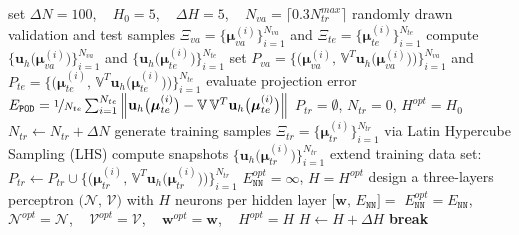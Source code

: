 \documentclass[12pt, a4paper, twoside, openright, notitlepage]{report}
\makeatletter
\numberwithin{equation}{chapter}
\DeclarePairedDelimiter\abs{\lvert}{\rvert}
\let\oldabs\abs
\def\abs{\@ifstar{\oldabs}{\oldabs*}}
\theoremstyle{theorem}
\theoremstyle{definition}
\theoremstyle{remark}
\theoremstyle{proposition}
\numberwithin{figure}{chapter}
\newcommand{\norm}[1]{\left\lVert#1\right\rVert}
\newcommand{\bg}[1]{\boldsymbol{#1}}
\makeatother
\begin{document}
		\begin{algorithm}[H]	
			\begin{algorithmic}[1]
					\vspace*{0.2cm}
					\State set $\Delta N = 100$, ~ $H_0 = 5$, ~ $\Delta H = 5$, ~ $N_{va} = \lceil 0.3 N_{tr}^{max} \rceil$ 
					\State randomly drawn validation and test samples $\Xi_{va} = \big\lbrace \bg{\mu}_{va}^{(i)} \big\rbrace_{i = 1}^{N_{va}}$ and $\Xi_{te} = \big\lbrace \bg{\mu}_{te}^{(i)} \big\rbrace_{i = 1}^{N_{te}}$
					\State compute $\big\lbrace \mathbf{u}_h \big( \bg{\mu}_{va}^{(i)} \big) \big\rbrace_{i = 1}^{N_{va}}$ and $\big\lbrace \mathbf{u}_h \big( \bg{\mu}_{te}^{(i)} \big) \big\rbrace_{i = 1}^{N_{te}}$
					\State set $P_{va} = \big\lbrace \big( \bg{\mu}_{va}^{(i)}, \, \mathbb{V}^T \mathbf{u}_h \big( \bg{\mu}_{va}^{(i)} \big) \big) \big\rbrace_{i = 1}^{N_{va}}$ and $P_{te} = \big\lbrace \big( \bg{\mu}_{te}^{(i)}, \, \mathbb{V}^T \mathbf{u}_h \big( \bg{\mu}_{te}^{(i)} \big) \big) \big\rbrace_{i = 1}^{N_{te}}$
					\State evaluate projection error $E_{\texttt{POD}} = \nicefrac{1}{N_{te}} \sum_{i = 1}^{N_{te}} \norm{\mathbf{u}_h \big( \bg{\mu}_{te}^{(i)} \big) - \mathbb{V} \, \mathbb{V}^T \mathbf{u}_h \big( \bg{\mu}_{te}^{(i)} \big)}$
					\State $P_{tr} = \emptyset$, $N_{tr} = 0$, $H^{opt} = H_0$
					\DoWhile
						\State $N_{tr} \leftarrow N_{tr} + \Delta N$
						\State generate training samples $\Xi_{tr} = \big\lbrace \bg{\mu}_{tr}^{(i)} \big\rbrace_{i = 1}^{N_{tr}}$ via Latin Hypercube Sampling (LHS)
						\State compute snapshots $\big\lbrace \mathbf{u}_h \big( \bg{\mu}_{tr}^{(i)} \big) \big\rbrace_{i = 1}^{N_{tr}}$
						\State extend training data set: $P_{tr} \leftarrow P_{tr} \cup \big\lbrace \big( \bg{\mu}_{tr}^{(i)}, \, \mathbb{V}^T \mathbf{u}_h \big( \bg{\mu}_{tr}^{(i)} \big) \big) \big\rbrace_{i = 1}^{N_{tr}}$
						\State $E_{\texttt{NN}}^{opt} = \infty$, $H = H^{opt}$
							\State design a three-layers perceptron $\big( \mathcal{N}, \, \mathcal{V} \big)$ with $H$ neurons per hidden layer
							\State $\big[ \mathbf{w}, \, E_{\texttt{NN}} \big] = $ 
								\State $E_{\texttt{NN}}^{opt} = E_{\texttt{NN}}$, ~ $\mathcal{N}^{opt} = \mathcal{N}$, ~ $\mathcal{V}^{opt} = \mathcal{V}$, ~ $\mathbf{w}^{opt} = \mathbf{w}$, ~ $H^{opt} = H$
								\State $H \leftarrow H + \Delta H$
							\Else {}
								\State \textbf{break}
							\EndIf
						\EndWhile
					\EndDoWhile{$N_{tr} \leq N_{tr}^{max}$ and $\abs{E_{\texttt{POD}} - E_{\texttt{NN}}^{opt}} > \varepsilon$}
				\EndFunction
				

\end{algorithmic}
\end{algorithm}
\end{document}
